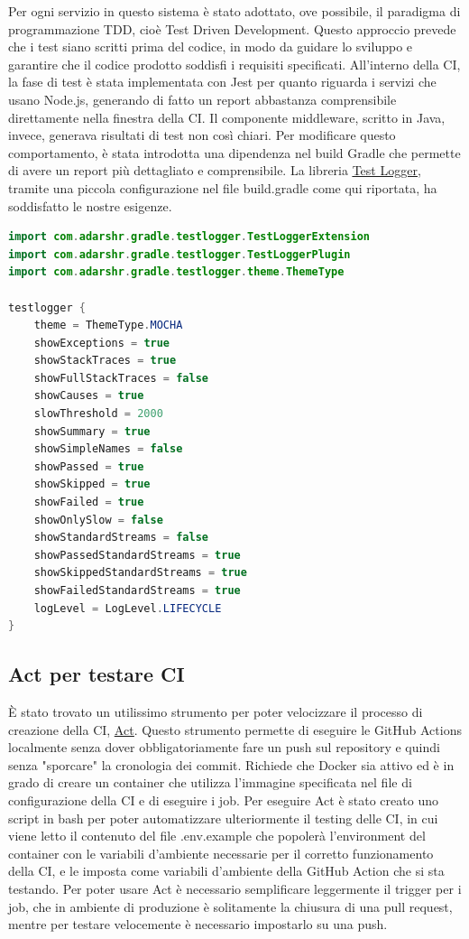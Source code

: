 Per ogni servizio in questo sistema è stato adottato, ove possibile, il paradigma di programmazione TDD, cioè Test Driven Development. Questo approccio prevede che i test siano scritti prima del codice, in modo da guidare lo sviluppo e garantire che il codice prodotto soddisfi i requisiti specificati.
All'interno della CI, la fase di test è stata implementata con Jest per quanto riguarda i servizi che usano Node.js, generando di fatto un report abbastanza comprensibile direttamente nella finestra della CI. Il componente middleware, scritto in Java, invece, generava risultati di test non così chiari. Per modificare questo comportamento, è stata introdotta una dipendenza nel build Gradle che permette di avere un report più dettagliato e comprensibile. 
La libreria \href{https://plugins.gradle.org/plugin/com.adarshr.test-logger}{\underline{Test Logger}}, tramite una piccola configurazione nel file build.gradle come qui riportata, ha soddisfatto le nostre esigenze.

\begin{lstlisting}[language=Java, caption={Test logger}, label=list:gradle_testlogger]
import com.adarshr.gradle.testlogger.TestLoggerExtension
import com.adarshr.gradle.testlogger.TestLoggerPlugin
import com.adarshr.gradle.testlogger.theme.ThemeType

testlogger {
    theme = ThemeType.MOCHA
    showExceptions = true
    showStackTraces = true
    showFullStackTraces = false
    showCauses = true
    slowThreshold = 2000
    showSummary = true
    showSimpleNames = false
    showPassed = true
    showSkipped = true
    showFailed = true
    showOnlySlow = false
    showStandardStreams = false
    showPassedStandardStreams = true
    showSkippedStandardStreams = true
    showFailedStandardStreams = true
    logLevel = LogLevel.LIFECYCLE
}
\end{lstlisting}

\subsection{Act per testare CI}

È stato trovato un utilissimo strumento per poter velocizzare il processo di creazione della CI, \href{https://github.com/nektos/act}{\underline{Act}}. Questo strumento permette di eseguire le GitHub Actions localmente senza dover obbligatoriamente fare un push sul repository e quindi senza "sporcare" la cronologia dei commit. Richiede che Docker sia attivo ed è in grado di creare un container che utilizza l'immagine specificata nel file di configurazione della CI e di eseguire i job. Per eseguire Act è stato creato uno script in bash per poter automatizzare ulteriormente il testing delle CI, in cui viene letto il contenuto del file .env.example che popolerà l'environment del container con le variabili d'ambiente necessarie per il corretto funzionamento della CI, e le imposta come variabili d'ambiente della GitHub Action che si sta testando. Per poter usare Act è necessario semplificare leggermente il trigger per i job, che in ambiente di produzione è solitamente la chiusura di una pull request, mentre per testare velocemente è necessario impostarlo su una push.

